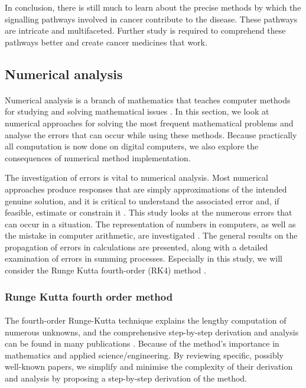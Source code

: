 In conclusion, there is still much to learn about the precise methods by which the signalling pathways involved in cancer contribute to the disease. These pathways are intricate and multifaceted. Further study is required to comprehend these pathways better and create cancer medicines that work.

\subsection{Numerical analysis}
\label{Num}

\paragraph{}
Numerical analysis is a branch of mathematics that teaches computer methods for studying and solving mathematical issues \cite{burden2015numerical}. In this section, we look at numerical approaches for solving the most frequent mathematical problems and analyse the errors that can occur while using these methods. Because practically all computation is now done on digital computers, we also explore the consequences of numerical method implementation.

The investigation of errors is vital to numerical analysis. Most numerical approaches produce responses that are simply approximations of the intended genuine solution, and it is critical to understand the associated error and, if feasible, estimate or constrain it \cite{heydari2016theoretical}. This study looks at the numerous errors that can occur in a situation. The representation of numbers in computers, as well as the mistake in computer arithmetic, are investigated \cite{cui2018numerical}. The general results on the propagation of errors in calculations are presented, along with a detailed examination of errors in summing processes. Especially in this study, we will consider the Runge Kutta fourth-order (RK4) method \cite{islam2015comparative}. 

\subsubsection{Runge Kutta fourth order method}
\label{RK}

\paragraph{}

The fourth-order Runge-Kutta technique explains the lengthy computation of numerous unknowns, and the comprehensive step-by-step derivation and analysis can be found in many publications \cite{tan2012general, mehdi2017using}. Because of the method's importance in mathematics and applied science/engineering. By reviewing specific, possibly well-known papers, we simplify and minimise the complexity of their derivation and analysis by proposing a step-by-step derivation of the method.

